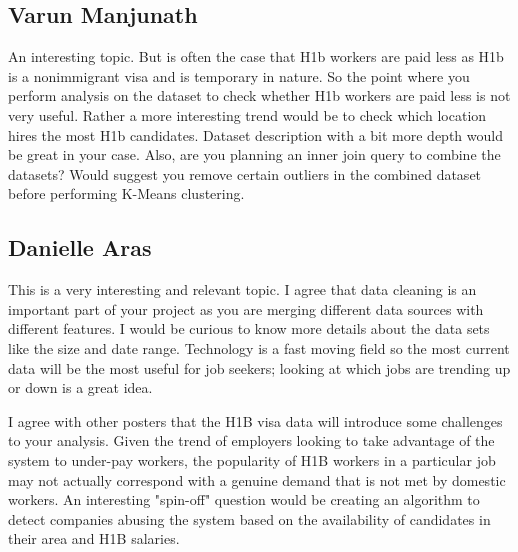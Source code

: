 \subsection*{Varun Manjunath}
An interesting topic. But is often the case that H1b workers are paid less as H1b is a nonimmigrant visa and is temporary in nature. So the point where you perform analysis on the dataset to check whether H1b workers are paid less is not very useful. Rather a more interesting trend would be to check which location hires the most H1b candidates. Dataset description with a bit more depth would be great in your case. Also, are you planning an inner join query to combine the datasets? Would suggest you remove certain outliers in the combined dataset before performing K-Means clustering.

\subsection*{Danielle Aras}
This is a very interesting and relevant topic. I agree that data cleaning is an important part of your project as you are merging different data sources with different features. I would be curious to know more details about the data sets like the size and date range. Technology is a fast moving field so the most current data will be the most useful for job seekers; looking at which jobs are trending up or down is a great idea.

I agree with other posters that the H1B visa data will introduce some challenges to your analysis. Given the trend of employers looking to take advantage of the system to under-pay workers, the popularity of H1B workers in a particular job may not actually correspond with a genuine demand that is not met by domestic workers. An interesting "spin-off" question would be creating an algorithm to detect companies abusing the system based on the availability of candidates in their area and H1B salaries.







